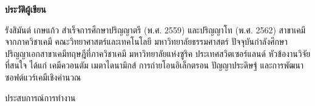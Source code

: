 

{
\thispagestyle{empty}

\begin{center}
    \LARGE\textbf{ประวัติผู้เขียน}
\end{center}

รังสิมันต์ เกษแก้ว สำเร็จการศึกษาปริญญาตรี (พ.ศ. 2559) และปริญญาโท (พ.ศ. 2562) สาขาเคมี จากภาควิชาเคมี 
คณะวิทยาศาสตร์และเทคโนโลยี มหาวิทยาลัยธรรมศาสตร์ ปัจจุบันกำลังศึกษาปริญญาเอกสาขาเคมีทฤษฎีที่ภาควิชาเคมี มหาวิทยาลัยแห่งซูริค 
ประเทศสวิตเซอร์แลนด์ หัวข้องานวิจัยที่สนใจ ได้แก่ เคมีควอนตัม เมตาไดนามิกส์ การถ่ายโอนอิเล็กตรอน ปัญญาประดิษฐ์ 
และการพัฒนาซอฟต์แวร์เคมีเชิงคำนวณ

\leavevmode
\vspace{-1.5em}

\noindent ประสบการณ์การทำงาน
\vspace{-1em}
\begin{flushleft}
\begin{table}[htbp]
\end{table}
\end{flushleft}

\vspace{-2em}

}
